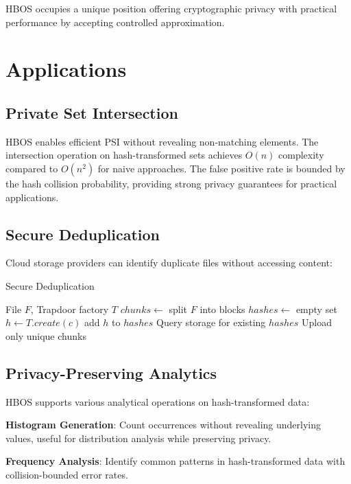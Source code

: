 \documentclass[10pt,conference]{IEEEtran}
\begin{document}
HBOS occupies a unique position offering cryptographic privacy with practical performance by accepting controlled approximation.

\section{Applications}
\label{sec:applications}

\subsection{Private Set Intersection}

HBOS enables efficient PSI without revealing non-matching elements. The intersection operation on hash-transformed sets achieves $O(n)$ complexity compared to $O(n^2)$ for naive approaches. The false positive rate is bounded by the hash collision probability, providing strong privacy guarantees for practical applications.

\subsection{Secure Deduplication}

Cloud storage providers can identify duplicate files without accessing content:

\begin{algorithm}
\caption{Secure Deduplication}
\begin{algorithmic}[1]
\REQUIRE File $F$, Trapdoor factory $T$
\STATE $chunks \leftarrow$ split $F$ into blocks
\STATE $hashes \leftarrow$ empty set
  \STATE $h \leftarrow T.create(c)$
  \STATE add $h$ to $hashes$
\ENDFOR
\STATE Query storage for existing $hashes$
\STATE Upload only unique chunks
\end{algorithmic}
\end{algorithm}

\subsection{Privacy-Preserving Analytics}

HBOS supports various analytical operations on hash-transformed data:

\textbf{Histogram Generation}: Count occurrences without revealing underlying values, useful for distribution analysis while preserving privacy.

\textbf{Frequency Analysis}: Identify common patterns in hash-transformed data with collision-bounded error rates.
\end{document}

